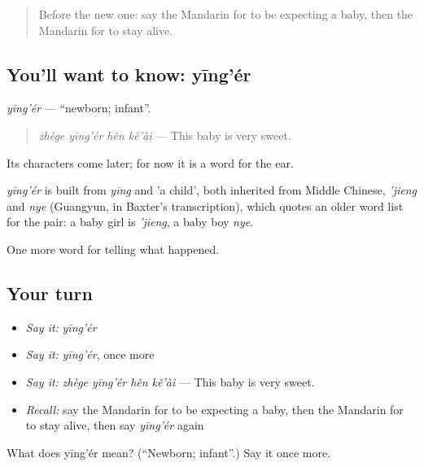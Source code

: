 \label{lesson:ZH-C302-yinger}



\begin{quote}
Before the new one: say the Mandarin for to be expecting a baby, then the Mandarin for to stay alive.
\end{quote}

\subsection*{You'll want to know: yīng'ér}
\emph{yīng'ér} — \textquotedblleft{}newborn; infant\textquotedblright{}.

\begin{quote}
\emph{zhège yīng'ér hěn kě'ài} — This baby is very sweet.
\end{quote}

Its characters come later; for now it is a word for the ear.

\begin{cousinweb}
\emph{yīng'ér} is built from \emph{yīng} and  'a child', both inherited from Middle Chinese, \emph{'jieng} and \emph{nye} (Guangyun, in Baxter's transcription), which quotes an older word list for the pair: a baby girl is \emph{'jieng}, a baby boy \emph{nye}.
\end{cousinweb}

\begin{grammarlens}[title={What you've built}]
One more word for telling what happened.
\end{grammarlens}

\subsection*{Your turn}
\begin{itemize}
\raggedright
  \item \emph{Say it:} \emph{yīng'ér}
  \item \emph{Say it:} \emph{yīng'ér}, once more
  \item \emph{Say it:} \emph{zhège yīng'ér hěn kě'ài} — This baby is very sweet.
  \item \emph{Recall:} say the Mandarin for to be expecting a baby, then the Mandarin for to stay alive, then say \emph{yīng'ér} again
\end{itemize}

\begin{tcolorbox}[breakable,colback=teal!4,colframe=teal!35!black,title={Before you move on}]
What does yīng'ér mean? (\textquotedblleft{}Newborn; infant\textquotedblright{}.) Say it once more.
\end{tcolorbox}
